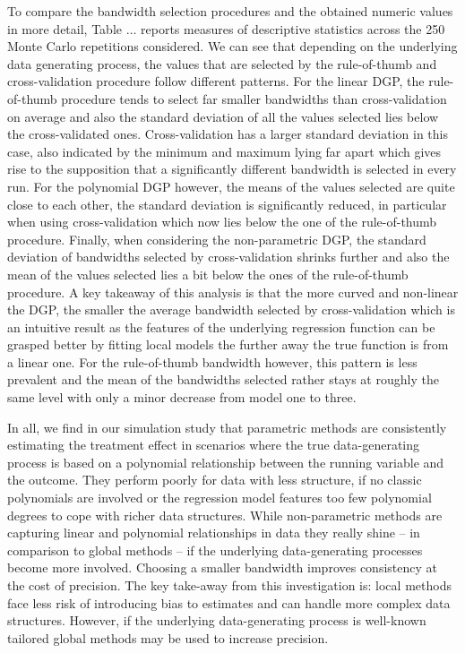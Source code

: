 To compare the bandwidth selection procedures and the obtained numeric values in more detail, Table $\dots$ reports measures of descriptive statistics across the 250 Monte Carlo repetitions considered. We can see that depending on the underlying data generating process, the values that are selected by the rule-of-thumb and cross-validation procedure follow different patterns. For the linear DGP, the rule-of-thumb procedure tends to select far smaller bandwidths than cross-validation on average and also the standard deviation of all the values selected lies below the cross-validated ones. Cross-validation has a larger standard deviation in this case, also indicated by the minimum and maximum lying far apart which gives rise to the supposition that a significantly different bandwidth is selected in every run. For the polynomial DGP however, the means of the values selected are quite close to each other, the standard deviation is significantly reduced, in particular when using cross-validation which now lies below the one of the rule-of-thumb procedure. Finally, when considering the non-parametric DGP, the standard deviation of bandwidths selected by cross-validation shrinks further and also the mean of the values selected lies a bit below the ones of the rule-of-thumb procedure. A key takeaway of this analysis is that the more curved and non-linear the DGP, the smaller the average bandwidth selected by cross-validation which is an intuitive result as the features of the underlying regression function can be grasped better by fitting local models the further away the true function is from a linear one. For the rule-of-thumb bandwidth however, this pattern is less prevalent and the mean of the bandwidths selected rather stays at roughly the same level with only a minor decrease from model one to three.

In all, we find in our simulation study that parametric methods are consistently estimating the treatment effect in scenarios where the true data-generating process is based on a polynomial relationship between the running variable and the outcome. They perform poorly for data with less structure, if no classic polynomials are involved or the regression model features too few polynomial degrees to cope with richer data structures. While non-parametric methods are capturing linear and polynomial relationships in data they really shine -- in comparison to global methods -- if the underlying data-generating processes become more involved. Choosing a smaller bandwidth improves consistency at the cost of precision. The key take-away from this investigation is: local methods face less risk of introducing bias to estimates and can handle more complex data structures. However, if the underlying data-generating process is well-known tailored global methods may be used to increase precision.











